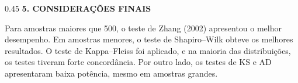\documentclass[final]{beamer}
\begin{document}
\begin{frame}[t]
\begin{columns}[t,totalwidth=0.6\paperwidth]
\begin{column}{0.45\textwidth}
 \vspace{1.3cm}
{\large\bfseries 5. CONSIDERAÇÕES FINAIS}\par


Para amostras maiores que 500, o teste de Zhang (2002) apresentou o melhor desempenho.
Em amostras menores, o teste de Shapiro–Wilk obteve os melhores resultados. O teste de Kappa–Fleiss foi aplicado, e na maioria das distribuições, os testes tiveram forte concordância. Por outro lado, os testes de KS e AD apresentaram baixa potência, mesmo em amostras grandes.

    
    \normalsize
  \end{column}
\end{columns}







\end{frame}
\end{document}
